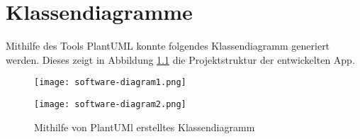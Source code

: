 
\chapter{Klassendiagramme}

Mithilfe des Tools PlantUML konnte folgendes Klassendiagramm generiert werden. Dieses zeigt in Abbildung \ref{fig:softwarediagram} die Projektstruktur der entwickelten App.

\begin{figure}[H]
    \centering
    \texttt{[image: software-diagram1.png]}
\end{figure}

\begin{figure}[H]
    \centering
    \texttt{[image: software-diagram2.png]}
    \caption{Mithilfe von PlantUMl erstelltes Klassendiagramm}
    \label{fig:softwarediagram}
\end{figure}